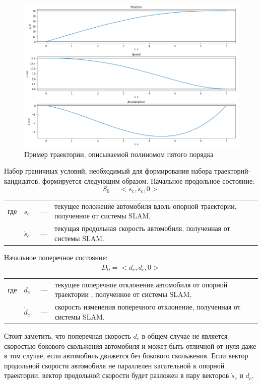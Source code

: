 \begin{figure}[h]
      \centering
      \includegraphics[width=\linewidth]{images/quintic_example}
      \caption{Пример траектории, описываемой полиномом пятого порядка}
      \label{img:quntic_example}
\end{figure}

Набор граничных условий, необходимый для формирования набора траекторий-кандидатов, формируется следующим образом.
Начальное продольное состояние:
\begin{equation}
      S_0 = <s_c, \dot{s}_c, 0>
\end{equation}
\noindent\begin{tabularx}{\linewidth}{lllX}
      где & $s_c$       &~---& текущее положение автомобиля вдоль опорной траектории, полученное от системы SLAM, \\
          & $\dot{s}_c$ &~---& текущая продольная скорость автомобиля, полученная от системы SLAM.
\end{tabularx}

Начальное поперечное состояние:
\begin{equation}
      D_0 = <d_c, \dot{d}_c, 0>
\end{equation}
\noindent\begin{tabularx}{\linewidth}{lllX}
      где & $d_c$       &~---& текущее поперечное отклонение автомобиля от опорной траектории , полученное от системы SLAM, \\
          & $\dot{d}_c$ &~---& скорость изменения поперечного отклонение, полученная от системы SLAM.
\end{tabularx}

Стоит заметить, что поперечная скорость $\dot{d}_c$ в общем случае не является скоростью бокового скольжения автомобиля
и может быть отличной от нуля даже в том случае, если автомобиль движется без бокового скольжения. Если вектор
продольной скорости автомобиля не параллелен касательной к опорной траектории, вектор продольной скорости будет разложен
в пару векторов $\dot{s}_c$ и $\dot{d}_c$.

